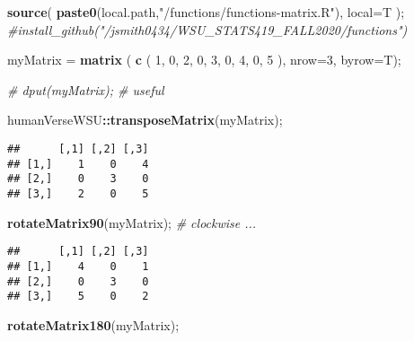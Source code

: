 \documentclass[
]{article}
\newenvironment{Shaded}{\begin{snugshade}}{\end{snugshade}}
\newcommand{\CommentTok}[1]{\textcolor[rgb]{0.56,0.35,0.01}{\textit{#1}}}
\newcommand{\DataTypeTok}[1]{\textcolor[rgb]{0.13,0.29,0.53}{#1}}
\newcommand{\DecValTok}[1]{\textcolor[rgb]{0.00,0.00,0.81}{#1}}
\newcommand{\KeywordTok}[1]{\textcolor[rgb]{0.13,0.29,0.53}{\textbf{#1}}}
\newcommand{\NormalTok}[1]{#1}
\newcommand{\OperatorTok}[1]{\textcolor[rgb]{0.81,0.36,0.00}{\textbf{#1}}}
\newcommand{\StringTok}[1]{\textcolor[rgb]{0.31,0.60,0.02}{#1}}
\begin{document}
\begin{Shaded}
\begin{Highlighting}[]
\KeywordTok{source}\NormalTok{( }\KeywordTok{paste0}\NormalTok{(local.path,}\StringTok{"/functions/functions-matrix.R"}\NormalTok{), }\DataTypeTok{local=}\NormalTok{T );}
\CommentTok{#install_github("/jsmith0434/WSU_STATS419_FALL2020/functions")}

\NormalTok{myMatrix =}\StringTok{ }\KeywordTok{matrix}\NormalTok{ ( }\KeywordTok{c}\NormalTok{ (}
                                            \DecValTok{1}\NormalTok{, }\DecValTok{0}\NormalTok{, }\DecValTok{2}\NormalTok{,}
                                            \DecValTok{0}\NormalTok{, }\DecValTok{3}\NormalTok{, }\DecValTok{0}\NormalTok{,}
                                            \DecValTok{4}\NormalTok{, }\DecValTok{0}\NormalTok{, }\DecValTok{5}
\NormalTok{                                            ), }\DataTypeTok{nrow=}\DecValTok{3}\NormalTok{, }\DataTypeTok{byrow=}\NormalTok{T);}

\CommentTok{# dput(myMatrix); # useful}
\end{Highlighting}
\end{Shaded}

\begin{Shaded}
\begin{Highlighting}[]
\NormalTok{humanVerseWSU}\OperatorTok{::}\KeywordTok{transposeMatrix}\NormalTok{(myMatrix);}
\end{Highlighting}
\end{Shaded}

\begin{verbatim}
##      [,1] [,2] [,3]
## [1,]    1    0    4
## [2,]    0    3    0
## [3,]    2    0    5
\end{verbatim}

\begin{Shaded}
\begin{Highlighting}[]
\KeywordTok{rotateMatrix90}\NormalTok{(myMatrix);  }\CommentTok{# clockwise ... }
\end{Highlighting}
\end{Shaded}

\begin{verbatim}
##      [,1] [,2] [,3]
## [1,]    4    0    1
## [2,]    0    3    0
## [3,]    5    0    2
\end{verbatim}

\begin{Shaded}
\begin{Highlighting}[]
\KeywordTok{rotateMatrix180}\NormalTok{(myMatrix);}
\end{Highlighting}
\end{Shaded}
\end{document}
